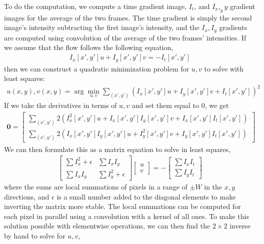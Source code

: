 \documentclass{article}
\begin{document}
To do the computation, we compute a time gradient image, $I_t$, and $I_x,_yy$ gradient images for the average of the two frames. The time gradient is simply the second image's intensity subtracting the first image's intensity, and the $I_x,I_y$ gradients are computed using convolution of the average of the two frames' intensities. 
If we assume that the flow follows the following equation,
\begin{align}
	I_x \left[x',y'\right] u + I_y \left[x',y'\right] v = -I_t \left[x',y'\right]
\end{align}
then we can construct a quadratic minimization problem for $u,v$ to solve with least squares:
\begin{align}
	u(x,y), v(x,y) = \arg\min_{u,v} \sum_{(x',y')} \left(I_x \left[x',y'\right]u + I_y \left[x',y'\right] v + I_t \left[x',y'\right]\right)^2
\end{align}
If we take the derivatives in terms of $u,v$ and set them equal to 0, we get
\begin{align}
	\mathbf{0} = \begin{bmatrix}
		\sum_{(x',y')} 2\left(I_x^2 \left[x',y'\right] u + I_x \left[x',y'\right] I_y \left[x',y'\right] v + I_x \left[x',y'\right] I_t \left[x',y'\right]\right) \\
		\sum_{(x',y')} 2\left(I_x \left[x',y'\right] I_y \left[x',y'\right] u + I_y^2 \left[x',y'\right] v + I_y \left[x',y'\right] I_t \left[x',y'\right]\right)
	\end{bmatrix}
\end{align}
We can then formulate this as a matrix equation to solve in least squares,
\begin{align}
	\begin{bmatrix}
		\sum I_x^2 +\epsilon & \sum I_xI_y \\
		\sum I_xI_y & \sum I_y^2 + \epsilon
	\end{bmatrix} \begin{bmatrix}
	u \\ v
	\end{bmatrix} = - \begin{bmatrix}
	\sum I_xI_t \\ \sum I_yI_t
	\end{bmatrix}
\end{align}
where the sums are local summations of pixels in a range of $\pm W$ in the $x,y$ directions, and $\epsilon$ is a small number added to the diagonal elements to make inverting the matrix more stable. The local summations can be computed for each pixel in parallel using a convolution with a kernel of all ones. To make this solution possible with elementwise operations, we can then find the $2\times2$ inverse by hand to solve for $u,v$, 
\end{document}
